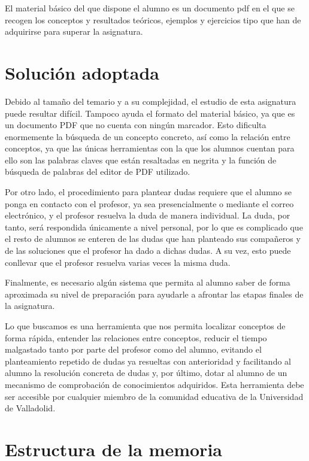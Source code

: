 \documentclass[openright,twoside,10pt]{book}
\begin{document}
    El material básico del que dispone el alumno es un documento pdf en el
    que se recogen los conceptos y resultados teóricos, ejemplos y
    ejercicios tipo que han de adquirirse para superar la asignatura.
    
    \section{Solución adoptada}\label{soluciuxf3n-adoptada}
    
    Debido al tamaño del temario y a su complejidad, el estudio de esta
    asignatura puede resultar difícil. Tampoco ayuda el formato del material
    básico, ya que es un documento PDF que no cuenta con ningún marcador.
    Esto dificulta enormemente la búsqueda de un concepto concreto, así como
    la relación entre conceptos, ya que las únicas herramientas con la que
    los alumnos cuentan para ello son las palabras claves que están
    resaltadas en negrita y la función de búsqueda de palabras del editor de
    PDF utilizado.
    
    Por otro lado, el procedimiento para plantear dudas requiere que el
    alumno se ponga en contacto con el profesor, ya sea presencialmente o
    mediante el correo electrónico, y el profesor resuelva la duda de manera
    individual. La duda, por tanto, será respondida únicamente a nivel
    personal, por lo que es complicado que el resto de alumnos se enteren de
    las dudas que han planteado sus compañeros y de las soluciones que el
    profesor ha dado a dichas dudas. A su vez, esto puede conllevar que el
    profesor resuelva varias veces la misma duda.
    
    Finalmente, es necesario algún sistema que permita al alumno saber de
    forma aproximada su nivel de preparación para ayudarle a afrontar las
    etapas finales de la asignatura.
    
    Lo que buscamos es una herramienta que nos permita localizar conceptos
    de forma rápida, entender las relaciones entre conceptos, reducir el
    tiempo malgastado tanto por parte del profesor como del alumno, evitando
    el planteamiento repetido de dudas ya resueltas con anterioridad y
    facilitando al alumno la resolución concreta de dudas y, por último,
    dotar al alumno de un mecanismo de comprobación de conocimientos
    adquiridos. Esta herramienta debe ser accesible por cualquier miembro de
    la comunidad educativa de la Universidad de Valladolid.
    
    \section{Estructura de la memoria}\label{estructura-de-la-memoria}
    
\end{document}
